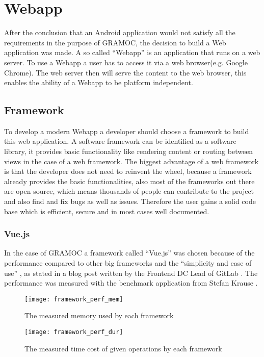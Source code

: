 \chapter{Webapp}
\label{ch:Webapp}

After the conclusion that an Android application would not satisfy all the requirements in the purpose of GRAMOC, the decision to build a Web application was made. A so called ``Webapp'' is an application that runs on a web server. To use a Webapp a user has to access it via a web browser(e.g. Google Chrome). The web server then will serve the content to the web browser, this enables the ability of a Webapp to be platform independent.

\section{Framework}
To develop a modern Webapp a developer should choose a framework to build this web application. A software framework can be identified as a software library, it provides basic functionality like rendering content or routing between views in the case of a web framework. The biggest advantage of a web framework is that the developer does not need to reinvent the wheel, because a framework already provides the basic functionalities, also most of the frameworks out there are open source, which means thousands of people can contribute to the project and also find and fix bugs as well as issues. Therefore the user gains a solid code base which is efficient, secure and in most cases well documented.

\subsection{Vue.js}
In the case of GRAMOC a framework called ``Vue.js'' \cite{Vue} was chosen because of the performance compared to other big frameworks and the ``simplicity and ease of use'' \cite{WhyVue}, as stated in a blog post written by the Frontend DC Lead of GitLab \cite{GitLab}. The performance was measured with the benchmark application from Stefan Krause \cite{FrameworkBenchmark}.

\begin{figure}[H]
    \centering
    \texttt{[image: framework\_perf\_mem]}
    \caption{The measured memory used by each framework}
    \label{fig:framework_perf_mem}
\end{figure}

\begin{figure}[H]
    \centering
    \texttt{[image: framework\_perf\_dur]}
    \caption{The measured time cost of given operations by each framework}
    \label{fig:framework_perf_dur}
\end{figure}

